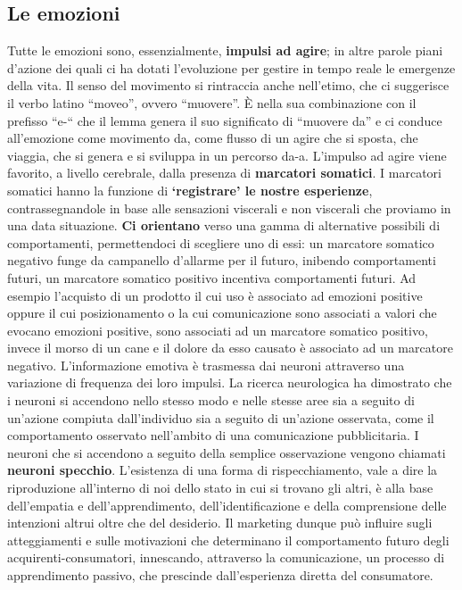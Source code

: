 \subsection{Le emozioni}
Tutte le emozioni sono, essenzialmente, \textbf{impulsi ad agire}; in altre parole piani d’azione dei quali ci ha dotati l'evoluzione per gestire in tempo reale le emergenze della vita.
Il senso del movimento si rintraccia anche nell’etimo, che ci suggerisce il verbo latino “moveo”, ovvero “muovere”. È nella sua combinazione con il prefisso “e-“ che il lemma genera il suo significato di “muovere da” e ci conduce all’emozione come movimento da, come flusso di un agire che si sposta, che viaggia, che si genera e si sviluppa in un percorso da-a.
L’impulso ad agire viene favorito, a livello cerebrale, dalla presenza di \textbf{marcatori somatici}.
I marcatori somatici hanno la funzione di \textbf{‘registrare’ le nostre esperienze}, contrassegnandole in base alle sensazioni viscerali e non viscerali che proviamo in una data situazione. \textbf{Ci orientano} verso una gamma di alternative possibili di comportamenti, permettendoci di scegliere uno di essi: un marcatore somatico negativo funge da campanello d'allarme per il futuro, inibendo comportamenti futuri, un marcatore somatico positivo
incentiva comportamenti futuri. Ad esempio l’acquisto di un prodotto il cui uso è associato ad emozioni positive oppure il cui posizionamento o la cui comunicazione sono associati a valori che evocano emozioni positive, sono associati ad un marcatore somatico positivo, invece il morso di un cane e il dolore da esso causato è associato ad un marcatore negativo. L’informazione emotiva è trasmessa dai neuroni attraverso una variazione di frequenza dei loro impulsi. La ricerca neurologica ha dimostrato che i neuroni si accendono nello stesso modo e nelle stesse aree sia a seguito di un’azione compiuta dall’individuo sia a seguito di un’azione osservata, come il comportamento osservato nell’ambito di una comunicazione pubblicitaria. I neuroni che si accendono a seguito della semplice osservazione vengono chiamati \textbf{neuroni specchio}. L’esistenza di una forma di rispecchiamento, vale a dire la riproduzione all’interno di noi dello stato in cui si trovano gli altri, è alla base dell’empatia e dell’apprendimento, dell’identificazione e della comprensione delle intenzioni altrui oltre che del desiderio. Il marketing dunque può influire sugli atteggiamenti e sulle motivazioni che determinano il comportamento futuro degli acquirenti-consumatori, innescando, attraverso la comunicazione, un processo di apprendimento passivo, che prescinde dall’esperienza diretta del consumatore.
